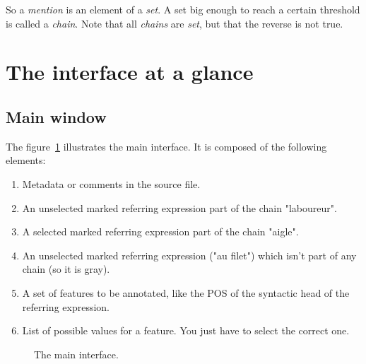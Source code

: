\documentclass[12pt]{article}
\begin{document}
So a \emph{mention} is an element of a \emph{set}.  A set big enough to reach
a certain threshold is called a \emph{chain}.  Note that all \emph{chains}
are \emph{set}, but that the reverse is not true.


 \section{The interface at a glance}

 \subsection{Main window}

The figure~\ref{fig:main-interface-at-a-glance} illustrates the main
interface.  It is composed of the following elements:
\begin{enumerate}
   \item Metadata or comments in the source file.
   \item An unselected marked referring expression part of the chain
   "laboureur".
   \item A selected marked referring expression part of the chain "aigle".
   \item An unselected marked referring expression ("au filet") which isn't
   part of any chain (so it is gray).
   \item A set of features to be annotated, like the POS of the syntactic head
   of the referring expression.
   \item List of possible values for a feature.  You just have to select the
   correct one.
\end{enumerate}

\begin{figure}
\begin{center}
{%
\setlength{\fboxsep}{0pt}%
}
\end{center}
\caption{The main interface.}
\label{fig:main-interface-at-a-glance}
\end{figure}
\end{document}
